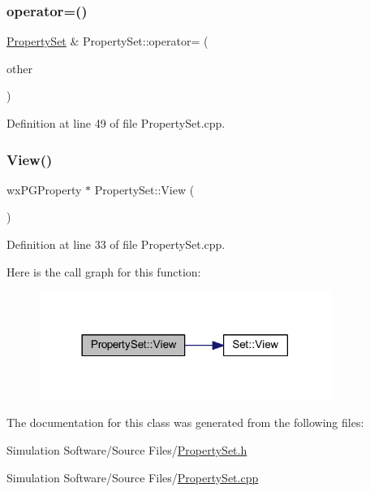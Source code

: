 \subsubsection{\texorpdfstring{operator=()}{operator=()}}
{\footnotesize\ttfamily \hyperlink{class_property_set}{Property\+Set} \& Property\+Set\+::operator= (\begin{DoxyParamCaption}\item[{const \hyperlink{class_property_set}{Property\+Set} \&}]{other }\end{DoxyParamCaption})}



Definition at line 49 of file Property\+Set.\+cpp.

\mbox{\label{class_property_set_a3838d3ec98d411f46cd22633b48ca091}} 
\subsubsection{\texorpdfstring{View()}{View()}}
{\footnotesize\ttfamily wx\+P\+G\+Property $\ast$ Property\+Set\+::\+View (\begin{DoxyParamCaption}{ }\end{DoxyParamCaption})}



Definition at line 33 of file Property\+Set.\+cpp.

Here is the call graph for this function\+:
\nopagebreak
\begin{figure}[H]
\begin{center}
\leavevmode
\includegraphics[width=270pt]{class_property_set_a3838d3ec98d411f46cd22633b48ca091_cgraph}
\end{center}
\end{figure}


The documentation for this class was generated from the following files\+:\begin{DoxyCompactItemize}
\item 
Simulation Software/\+Source Files/\hyperlink{_property_set_8h}{Property\+Set.\+h}\item 
Simulation Software/\+Source Files/\hyperlink{_property_set_8cpp}{Property\+Set.\+cpp}\end{DoxyCompactItemize}
